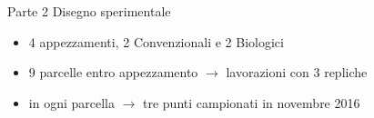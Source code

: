 \documentclass[xcolor={usenames, table, x11names}, final, 10pt]{beamer}
\begin{document}
\begin{frame}{Parte 2 \small{Disegno sperimentale}}
  \begin{overlayarea}{\textwidth}{0.20\textheight}  
    \begin{itemize}[<+->]
    \item 4 appezzamenti, 2 Convenzionali e 2 Biologici
    \item 9 parcelle entro appezzamento $\rightarrow$ lavorazioni con 3 repliche
    \item in ogni parcella $\rightarrow$ tre punti campionati in novembre 2016
    \end{itemize}
  \end{overlayarea}
  \begin{overlayarea}{\textwidth}{0.60\textheight}
\end{overlayarea}
\end{frame}
\end{document}

